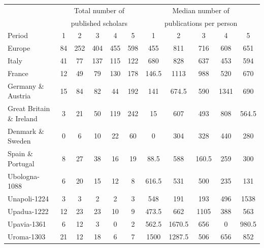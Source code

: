 \begin{table}[htbp]\centering
		\begin{tabular}{lcccccccccc}%
\toprule
			& \multicolumn{5}{c}{Total number of }  & \multicolumn{5}{c}{Median number of }\\
			& \multicolumn{5}{c}{published scholars}  & \multicolumn{5}{c}{ publications per person}\\
			Period   & 1 &2 & 3 & 4 & 5  & 1 &2 & 3 & 4 & 5\\
\midrule
Europe   & 84       & 252      & 404      & 455      & 598      & 455      & 811      & 716      & 608      & 651 \\
Italy    & 41       & 77       & 137      & 115      & 122      & 680      & 828      & 637      & 453      & 594 \\
France   & 12       & 49       & 79       & 130      & 178      & 146.5    & 1113     & 988      & 520      & 670 \\
Germany \& Austria & 15       & 84       & 82       & 44       & 192      & 141      & 674.5    & 590      & 1341     & 690 \\
Great Britain \& Ireland & 3        & 21       & 50       & 119      & 242      & 15       & 607      & 493      & 808      & 564.5 \\
Denmark \& Sweden & 0        & 6        & 10       & 22       & 60       & 0        & 304      & 328      & 440      & 280 \\
Spain \& Portugal & 8        & 27       & 38       & 16       & 19       & 88.5     & 588      & 160.5    & 259      & 300 \\
Ubologna-1088 & 6        & 20       & 15       & 12       & 8        & 616.5    & 531      & 500      & 235      & 131 \\
Unapoli-1224 & 3        & 3        & 2        & 2        & 3        & 548      & 191      & 193      & 496      & 1538 \\
Upadua-1222 & 12       & 23       & 23       & 10       & 9        & 473.5    & 662      & 1105     & 388      & 563 \\
Upavia-1361 & 6        & 12       & 3        & 0        & 2        & 562.5    & 1670.5   & 656      & 0        & 980.5 \\
Uroma-1303 & 21       & 12       & 18       & 6        & 7        & 1500     & 1287.5   & 506      & 656      & 852 \\

\end{tabular}
\end{table}
